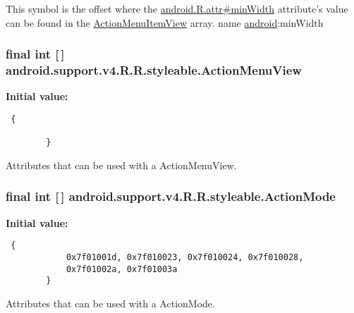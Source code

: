 This symbol is the offset where the \hyperlink{}{android.R.attr\#minWidth} attribute's value can be found in the \hyperlink{classandroid_1_1support_1_1v4_1_1_r_1_1styleable_2f03c9fcd2a52e8fee3ae3171db87b03}{ActionMenuItemView} array.  name \hyperlink{namespaceandroid}{android}:minWidth \hypertarget{classandroid_1_1support_1_1v4_1_1_r_1_1styleable_d3b42510407946124b468ccdcb585ed8}{
\subsubsection[{ActionMenuView}]{\setlength{\rightskip}{0pt plus 5cm}final int \mbox{[}$\,$\mbox{]} android.support.v4.R.R.styleable.ActionMenuView}}
\label{classandroid_1_1support_1_1v4_1_1_r_1_1styleable_d3b42510407946124b468ccdcb585ed8}


\textbf{Initial value:}

\begin{Code}\begin{verbatim} {
            
        }
\end{verbatim}
\end{Code}
Attributes that can be used with a ActionMenuView. \hypertarget{classandroid_1_1support_1_1v4_1_1_r_1_1styleable_cb0fd98eb07ef010055f95821e8da84e}{
\subsubsection[{ActionMode}]{\setlength{\rightskip}{0pt plus 5cm}final int \mbox{[}$\,$\mbox{]} android.support.v4.R.R.styleable.ActionMode}}
\label{classandroid_1_1support_1_1v4_1_1_r_1_1styleable_cb0fd98eb07ef010055f95821e8da84e}


\textbf{Initial value:}

\begin{Code}\begin{verbatim} {
            0x7f01001d, 0x7f010023, 0x7f010024, 0x7f010028,
            0x7f01002a, 0x7f01003a
        }
\end{verbatim}
\end{Code}
Attributes that can be used with a ActionMode. 

